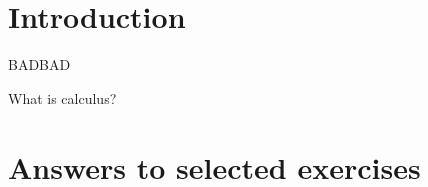 \documentclass[justified,marginals=raggedouter]{tufte-book}
\newcounter{exercise}
\begin{document}

\chapter*{Introduction}

BADBAD

What is calculus?

\mainmatter







%

%
%
%
%
%


\backmatter

%
%

\chapter*{Answers to selected exercises}


\printindex
\end{document}
